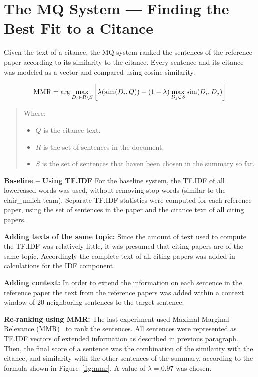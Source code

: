 \documentclass[11pt]{article}
\begin{document}

\section{The MQ System --- Finding the Best Fit to a Citance}
\label{s:mq}
Given the text of a citance, the MQ system ranked the sentences of the reference paper 
according to its similarity to the citance. Every sentence and its citance was modeled 
as a vector and compared using cosine similarity. 

\begin{figure*}
$$
\hbox{MMR} = \arg\max_{D_i\in R\setminus S}\left[\lambda(\hbox{sim}(D_i,Q)) -
(1-\lambda) \max_{D_j\in S} \hbox{sim}(D_i,D_j)\right]
$$  
\begin{quote}
Where:
\begin{itemize}
\item $Q$ is the citance text.
\item $R$ is the set of sentences in the document.
\item $S$ is the set of sentences that haven been chosen in the
  summary so far.  
\end{itemize}
\end{quote}
  \caption{Maximal Marginal Relevance (MMR)}
  \label{fig:mmr}
\end{figure*}

\textbf{Baseline -- Using TF.IDF}
For the baseline system, the TF.IDF of all lowercased words was used, 
without removing stop words (similar to the clair\_umich team). 
Separate TF.IDF statistics were computed for each reference paper, 
using the set of sentences in the paper and the citance text of all 
citing papers.

\textbf{Adding texts of the same topic:}
Since the amount of text used to compute the TF.IDF was relatively little, 
it was presumed that citing papers are of the same topic. Accordingly the 
complete text of all citing papers was added in calculations for the IDF 
component.

\textbf{Adding context:}
In order to  extend the information on each sentence in the reference paper 
the text from the reference papers was added within a context window of 
20 neighboring sentences to the target sentence. 

\textbf{Re-ranking using MMR:}
The last experiment used Maximal Marginal Relevance (MMR)~\cite{Carbonell:1998} 
to rank the sentences. All sentences were represented as TF.IDF vectors of 
extended information as described in previous paragraph. Then, the final score 
of a sentence was the combination of the similarity with the citance, and 
similarity with the other sentences of the summary, according to the formula 
shown in Figure~\ref{fig:mmr}. A value of $\lambda=0.97$ was chosen.
\end{document}
